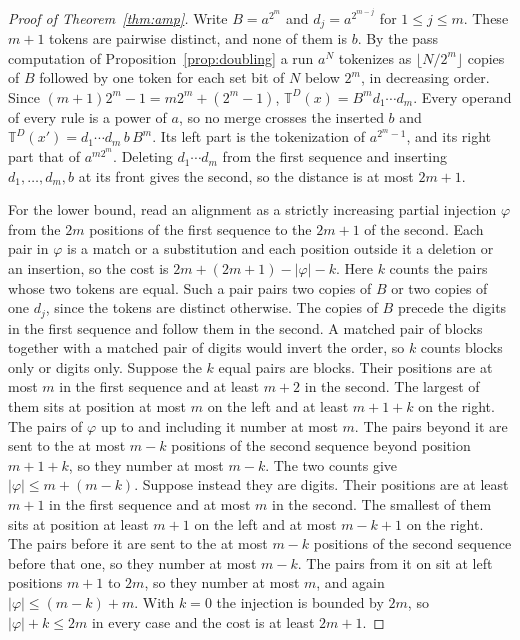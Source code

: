 \documentclass[11pt,a4paper]{article}
\theoremstyle{definition}
\theoremstyle{plain}
\newcommand{\T}{\mathbb{T}}
\begin{document}
\begin{proof}[Proof of Theorem~\ref{thm:amp}]
Write \(B = a^{2^m}\) and \(d_j = a^{2^{m-j}}\) for \(1 \le j \le m\). These \(m + 1\) tokens are pairwise distinct, and
none of them is \(b\). By the pass computation of Proposition~\ref{prop:doubling} a run \(a^N\) tokenizes as
\(\lfloor N/2^m \rfloor\) copies of \(B\) followed by one token for each set bit of \(N\) below \(2^m\), in decreasing
order. Since \((m+1)2^m - 1 = m2^m + (2^m - 1)\), \(\T^D(x) = B^m d_1 \cdots d_m\). Every operand of every rule is a
power of \(a\), so no merge crosses the inserted \(b\) and \(\T^D(x') = d_1 \cdots d_m\, b\, B^m\). Its left part is the
tokenization of \(a^{2^m - 1}\), and its right part that of \(a^{m2^m}\). Deleting \(d_1 \cdots d_m\) from the first
sequence and inserting \(d_1, \dots, d_m, b\) at its front gives the second, so the distance is at most \(2m + 1\).

For the lower bound, read an alignment as a strictly increasing partial injection \(\varphi\) from the \(2m\) positions
of the first sequence to the \(2m + 1\) of the second. Each pair in \(\varphi\) is a match or a substitution and each
position outside it a deletion or an insertion, so the cost is \(2m + (2m + 1) - |\varphi| - k\). Here \(k\) counts the
pairs whose two tokens are equal. Such a pair pairs two copies of \(B\) or two copies of one \(d_j\), since the tokens
are distinct otherwise. The copies of \(B\) precede the digits in the first sequence and follow them in the second. A
matched pair of blocks together with a matched pair of digits would invert the order, so \(k\) counts blocks only or
digits only. Suppose the \(k\) equal pairs are blocks. Their positions are at most \(m\) in the first sequence and at
least \(m + 2\) in the second. The largest of them sits at position at most \(m\) on the left and at least \(m + 1 + k\)
on the right. The pairs of \(\varphi\) up to and including it number at most \(m\). The pairs beyond it are sent to the
at most \(m - k\) positions of the second sequence beyond position \(m + 1 + k\), so they number at most \(m - k\). The
two counts give \(|\varphi| \le m + (m - k)\). Suppose instead they are digits. Their positions are at least \(m + 1\)
in the first sequence and at most \(m\) in the second. The smallest of them sits at position at least \(m + 1\) on the
left and at most \(m - k + 1\) on the right. The pairs before it are sent to the at most \(m - k\) positions of the
second sequence before that one, so they number at most \(m - k\). The pairs from it on sit at left positions \(m + 1\)
to \(2m\), so they number at most \(m\), and again \(|\varphi| \le (m - k) + m\). With \(k = 0\) the injection is
bounded by \(2m\), so \(|\varphi| + k \le 2m\) in every case and the cost is at least \(2m + 1\).
\end{proof}
\end{document}
